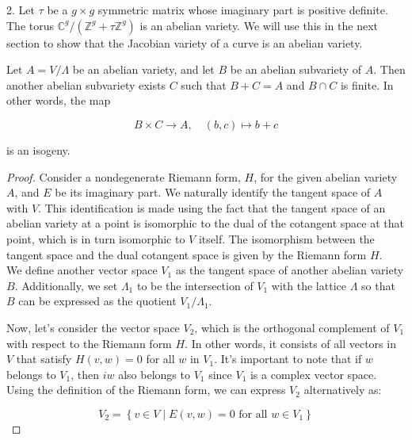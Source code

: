 \begin{remark}
\begin{remark}
2. 
Let $\tau$ be a $g \times g$ symmetric matrix whose imaginary part is positive definite. The torus $\mathbb{C}^{g} /\left(\mathbb{Z}^{g}+\tau \mathbb{Z}^{g}\right)$ is an abelian variety. We will use this in the next section to show that the Jacobian variety of a curve is an abelian variety.
\end{remark}







\begin{proposition}\label{abe}
    Let $A=V / \Lambda$ be an abelian variety, and let $B$ be an abelian subvariety of $A$. Then another abelian subvariety exists $C$ such that $B+C=A$ and $B \cap C$ is finite. In other words, the map

$$
B \times C \longrightarrow A, \quad(b, c) \longmapsto b+c
$$

is an isogeny.
\end{proposition}

\begin{proof}\cite{hindry-silverman-diophantine}
Consider a nondegenerate Riemann form, $H$, for the given abelian variety $A$, and $E$ be its imaginary part. We naturally identify the tangent space of $A$ with $V$. This identification is made using the fact that the tangent space of an abelian variety at a point is isomorphic to the dual of the cotangent space at that point, which is in turn isomorphic to $V$ itself. The isomorphism between the tangent space and the dual cotangent space is given by the Riemann form $H$.\\

We define another vector space $V_{1}$ as the tangent space of another abelian variety $B$. Additionally, we set $\Lambda_{1}$ to be the intersection of $V_{1}$ with the lattice $\Lambda$ so that $B$ can be expressed as the quotient $V_{1} / \Lambda_{1}$.

Now, let's consider the vector space $V_{2}$, which is the orthogonal complement of $V_{1}$ with respect to the Riemann form $H$. In other words, it consists of all vectors in $V$ that satisfy $H(v, w) = 0$ for all $w$ in $V_{1}$. It's important to note that if $w$ belongs to $V_{1}$, then $iw$ also belongs to $V_{1}$ since $V_{1}$ is a complex vector space. Using the definition of the Riemann form, we can express $V_{2}$ alternatively as:

$$
V_{2} = \left\{v \in V \mid E(v, w) = 0 \text { for all } w \in V_{1}\right\}
$$


\end{proof}
\end{remark}
